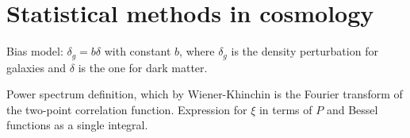 \documentclass[main.tex]{subfiles}
\begin{document}
\section{Statistical methods in cosmology}



%



Bias model: \(\delta _g = b \delta \) with constant \(b\), where \(\delta_g \) is the density perturbation for galaxies and \(\delta \) is the one for dark matter.

Power spectrum definition, which by Wiener-Khinchin is the Fourier transform of the two-point correlation function. 
Expression for \(\xi \) in terms of \(P\) and Bessel functions as a single integral. 
\end{document}
